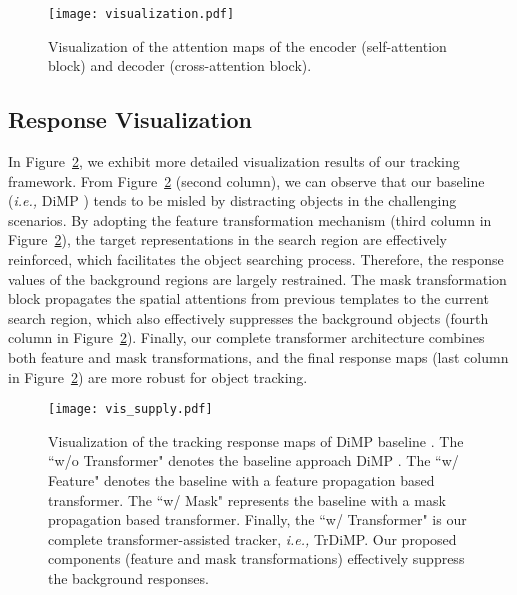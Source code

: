 \documentclass[10pt,twocolumn,letterpaper]{article}
\begin{document}
\begin{figure}
	\centering
	\texttt{[image: visualization.pdf]}
	\caption{Visualization of the attention maps of the encoder (self-attention block) and decoder (cross-attention block).}
	\label{fig:atten_vis}
\vspace{-0.0in}
\end{figure}




\subsection{Response Visualization}

In Figure~\ref{fig:vis}, we exhibit more detailed visualization results of our tracking framework.
From Figure~\ref{fig:vis} (second column), we can observe that our baseline (\emph{i.e.,} DiMP \cite{DiMP}) tends to be misled by distracting objects in the challenging scenarios.
By adopting the feature transformation mechanism (third column in Figure~\ref{fig:vis}), the target representations in the search region are effectively reinforced, which facilitates the object searching process.
Therefore, the response values of the background regions are largely restrained.
The mask transformation block propagates the spatial attentions from previous templates to the current search region, which also effectively suppresses the background objects (fourth column in Figure~\ref{fig:vis}).
Finally, our complete transformer architecture combines both feature and mask transformations, and the final response maps (last column in Figure~\ref{fig:vis}) are more robust for object tracking.


\begin{figure}
	\centering
	\texttt{[image: vis\_supply.pdf]}
	\caption{Visualization of the tracking response maps of DiMP baseline \cite{DiMP}. The ``w/o Transformer" denotes the baseline approach DiMP \cite{DiMP}. The ``w/ Feature" denotes the baseline with a feature propagation based transformer. The ``w/ Mask" represents the baseline with a mask propagation based transformer. Finally, the ``w/ Transformer" is our complete transformer-assisted tracker, \emph{i.e.,} TrDiMP. Our proposed components (feature and mask transformations) effectively suppress the background responses. }
	\label{fig:vis} 
\vspace{-0.05in}
\end{figure}
\end{document}
